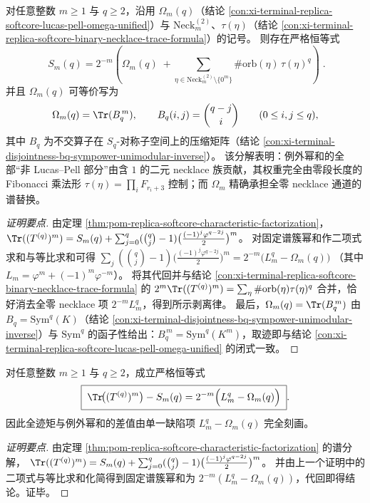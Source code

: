 \begin{conclusion}\label{con:xi-terminal-replica-softcore-exceptional-power-sum-necklace-peeling}
对任意整数 \(m\ge 1\) 与 \(q\ge 2\)，沿用 \(\Omega_m(q)\)（结论 \ref{con:xi-terminal-replica-softcore-lucas-pell-omega-unified}）与
\(\mathrm{Neck}_m^{(2)}\)、\(\tau(\eta)\)（结论 \ref{con:xi-terminal-replica-softcore-binary-necklace-trace-formula}）的记号。
则存在严格恒等式
\[
\boxed{\;
S_m(q)
=2^{-m}\left(
\Omega_m(q)
\;+\!\!\!\sum_{\eta\in \mathrm{Neck}_m^{(2)}\setminus\{0^m\}}\#\mathrm{orb}(\eta)\,\tau(\eta)^{q}
\right)\; } .
\]
并且 \(\Omega_m(q)\) 可等价写为
\[
\Omega_m(q)=\Tr(B_q^{\,m}),
\qquad
B_q(i,j)=\binom{q-j}{i}\qquad(0\le i,j\le q),
\]
其中 \(B_q\) 为不交算子在 \(S_q\)-对称子空间上的压缩矩阵（结论 \ref{con:xi-terminal-disjointness-bq-sympower-unimodular-inverse}）。
该分解表明：例外幂和的全部“非 Lucas--Pell 部分”由含 \(1\) 的二元 necklace 族贡献，其权重完全由零段长度的 Fibonacci 乘法形 \(\tau(\eta)=\prod_i F_{r_i+3}\) 控制；而 \(\Omega_m\) 精确承担全零 necklace 通道的谱替换。
\end{conclusion}
\begin{proof}[证明要点]
由定理 \ref{thm:pom-replica-softcore-characteristic-factorization}，
\(
\Tr((T^{(q)})^m)=S_m(q)+\sum_{j=0}^{q}(\binom{q}{j}-1)\bigl(\frac{(-1)^j\varphi^{q-2j}}{2}\bigr)^m
\)。
对固定谱簇幂和作二项式求和与等比求和可得
\(
\sum_{j}(\binom{q}{j}-1)\bigl(\frac{(-1)^j\varphi^{q-2j}}{2}\bigr)^m
=2^{-m}\bigl(L_m^{q}-\Omega_m(q)\bigr)
\)
（其中 \(L_m=\varphi^m+(-1)^m\varphi^{-m}\)）。
将其代回并与结论 \ref{con:xi-terminal-replica-softcore-binary-necklace-trace-formula} 的
\(
2^{m}\Tr((T^{(q)})^m)=\sum_{\eta}\#\mathrm{orb}(\eta)\tau(\eta)^q
\)
合并，恰好消去全零 necklace 项 \(2^{-m}L_m^q\)，得到所示剥离律。
最后，\(\Omega_m(q)=\Tr(B_q^{\,m})\) 由 \(B_q=\mathrm{Sym}^q(K)\)（结论 \ref{con:xi-terminal-disjointness-bq-sympower-unimodular-inverse}）与 \(\mathrm{Sym}^q\) 的函子性给出：\(B_q^{\,m}=\mathrm{Sym}^q(K^m)\)，取迹即与结论 \ref{con:xi-terminal-replica-softcore-lucas-pell-omega-unified} 的闭式一致。
\end{proof}

\begin{conclusion}[对称化缺陷项的精确表达]\label{con:xi-terminal-replica-softcore-trace-exceptional-difference}
对任意整数 \(m\ge 1\) 与 \(q\ge 2\)，成立严格恒等式
\[
\boxed{\;
\Tr\!\bigl((T^{(q)})^m\bigr)-S_m(q)=2^{-m}\Bigl(L_m^{q}-\Omega_m(q)\Bigr)\; } .
\]
因此全迹矩与例外幂和的差值由单一缺陷项 \(L_m^{q}-\Omega_m(q)\) 完全刻画。
\end{conclusion}
\begin{proof}[证明要点]
由定理 \ref{thm:pom-replica-softcore-characteristic-factorization} 的谱分解，
\(
\Tr((T^{(q)})^m)=S_m(q)+\sum_{j=0}^{q}(\binom{q}{j}-1)\bigl(\frac{(-1)^j\varphi^{q-2j}}{2}\bigr)^m
\)。
并由上一个证明中的二项式与等比求和化简得到固定谱簇幂和为 \(2^{-m}(L_m^q-\Omega_m(q))\)，代回即得结论。证毕。
\end{proof}

